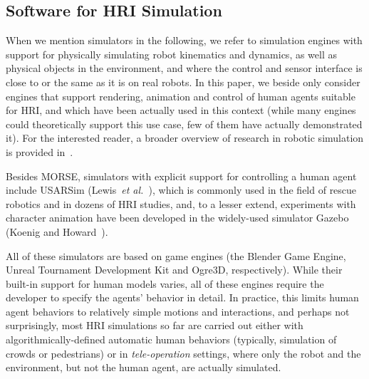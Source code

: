 \documentclass{llncs}
\newcommand{\etal}{{\textit{et al.~}}}
\begin{document}
\subsection{Software for HRI Simulation}

When we mention simulators in the following, we refer to simulation engines with
support for physically simulating robot kinematics and dynamics, as well as
physical objects in the environment, and where the control and sensor interface
is close to or the same as it is on real robots. In this paper, we beside
only consider engines that support rendering, animation and control of human agents
suitable for HRI, and which have been actually used in this context (while many
engines could theoretically support this use case, few of them have actually
demonstrated it). For the interested reader, a broader overview of research in
robotic simulation is provided in~\cite{Ando2010}.

Besides MORSE, simulators with explicit support for controlling a human agent
include USARSim (Lewis~\etal\cite{lewis2007usarsim}), which is commonly used in
the field of rescue robotics and in dozens of HRI studies, and, to a
lesser extend, experiments with character animation have been developed in the
widely-used simulator Gazebo (Koenig and Howard~\cite{Koenig2004}).


%

All of these simulators are based on game engines (the Blender Game Engine,
Unreal Tournament Development Kit and Ogre3D, respectively). While their
built-in support for human models varies, all of these engines require the
developer to specify the agents' behavior in detail. In practice, this limits
human agent behaviors to relatively simple motions and interactions, and perhaps
not surprisingly, most HRI simulations so far are carried out either with
algorithmically-defined automatic human behaviors (typically, simulation of
crowds or
pedestrians) or in
\emph{tele-operation} settings, where only the robot and the environment, but
not the human agent, are actually simulated.
\end{document}
